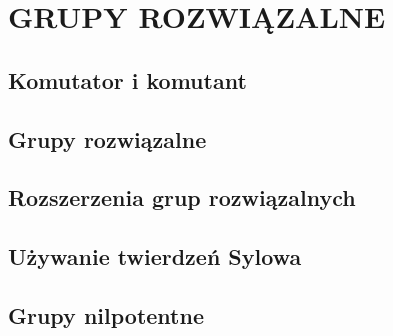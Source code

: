 \section{GRUPY ROZWIĄZALNE}

\subsection{Komutator i komutant}

\subsection{Grupy rozwiązalne}

\subsection{Rozszerzenia grup rozwiązalnych}

\subsection{Używanie twierdzeń Sylowa}

\subsection{Grupy nilpotentne}